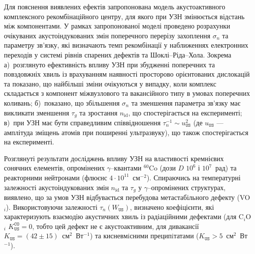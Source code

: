 Для пояснення виявлених ефектів запропонована модель акустоактивного комплексного рекомбінаційного центру,
для якого при УЗН змінюється відстань між компонентами.
У рамках запропонованої моделі проведено розрахунки очікуваних акустоіндукованих змін поперечного перерізу захоплення $\sigma_{n}$ та параметру зв'язку,
які визначають темп рекомбінації у наближеннях електронних переходів у системі рівнів спарених дефектів та  Шоклі--Ріда--Хола.
Зокрема
а)~розглянуто ефективність впливу УЗН при збудженні поперечних та повздовжніх хвиль із врахуванням наявності просторово орієнтованих дислокацій та показано, що найбільші зміни очікуються у випадку, коли комплекс складається з компонент міжвузлового та вакансійного типу  в умовах поперечних коливань;
б)~показано, що збільшення $\sigma_{n}$ та зменшення параметра зв'язку має викликати зменшення $\tau_g$ та зростання $n_\mathrm{id}$, що спостерігається на експерименті;
в)~при УЗН має бути справедливим співвідношення $\tau_{n}^{-1}\sim u_{\mathtt{US}}^2$ (де $u_\mathtt{US}$ --- амплітуда зміщень атомів при поширенні ультразвуку), що також спостерігається на експерименті.

Розглянуті результати досліджень впливу УЗН на властивості кремнієвих сонячних елементів,
опромінених $\gamma$--квантами $^{60}$Co (дози $D$ $10^6$ і $10^7$~рад) та реакторними нейтронами (флюєнс $4\cdot10^{11}$~см$^{-2}$).
Спираючись на температурні залежності акустоіндукованих змін $n_\mathrm{id}$ та $\tau_{g}$ у $\gamma$--опромінених структурах, виявлено, що за умов УЗН відбувається  перебудова метастабільного дефекту (VO$_i$).
Використовуючи залежності $\tau_n(W_\mathtt{US})$,  визначено коефіцієнти, які характеризують взаємодію акустичних хвиль із радіаційними дефектами (для C$_i$O$_i$ $K_\mathtt{US}^\mathtt{CO}=0$, тобто цей дефект не є акустоактивним,
для дивакансії $K_\mathtt{US}=(42\pm15)$~см$^2$~Вт$^{-1}$)
та кисневмiсними преципiтатами ($K_\mathtt{US}>5$~см$^2$~Вт$^{-1}$).

